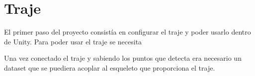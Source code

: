 \section{Traje}
\label{sec:traje}

El primer paso del proyecto consistía en configurar el traje y poder usarlo dentro de Unity.
Para poder usar el traje se necesita 

Una vez conectado el traje y sabiendo los puntos que detecta era necesario un dataset que se puediera acoplar al esqueleto que proporciona el traje.